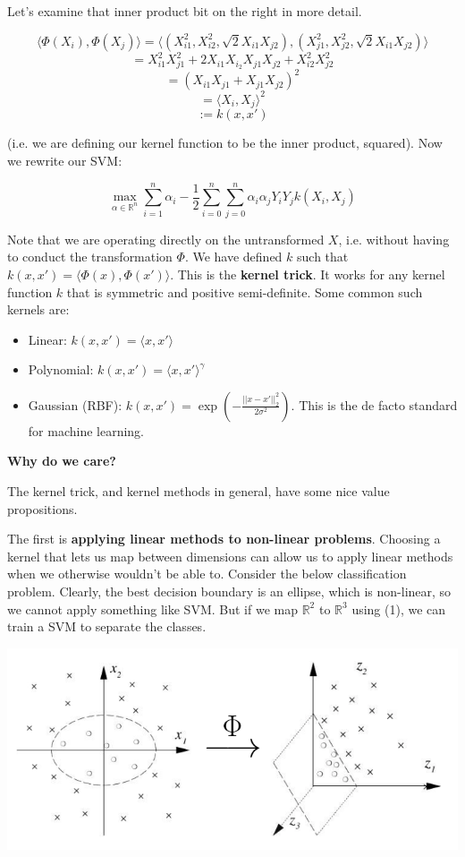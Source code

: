 \documentclass{article}
\begin{document}
Let's examine that inner product bit on the right in more detail.

$$
\langle \Phi(X_i), \Phi(X_j) \rangle = \langle (X_{i1}^2, X_{i2}^2,
\sqrt{2}X_{i1}X_{j2}),  (X_{j1}^2, X_{j2}^2,
\sqrt{2}X_{i1}X_{j2})\rangle
$$
$$
= X_{i1}^2X_{j1}^2 + 2X_{i1}X_{i_2}X_{j1}X_{j2} + X_{i2}^2X_{j2}^2
$$
$$
= (X_{i1}X_{j1} + X_{j1}X_{j2})^2
$$
$$
= \langle X_i, X_j \rangle^2
$$
$$
:= k(x, x')
$$

(i.e. we are defining our kernel function to be the inner product, squared). Now we rewrite our SVM:

$$
\max_{\alpha \in \mathbb{R}^n} 
\sum_{i=1}^n \alpha_i - \frac{1}{2} \sum_{i=0}^n \sum_{j=0}^n \alpha_i \alpha_j
Y_i Y_j k(X_i, X_j)
$$

Note that we are operating directly on the untransformed $X$, i.e. without
having to conduct the transformation $\Phi$. We have defined $k$ such that $k(x,
x') = \langle \Phi(x), \Phi(x') \rangle$. This is the \textbf{kernel trick}.
It works for any kernel function $k$ that is symmetric and positive
semi-definite. Some common such kernels are:
\begin{itemize}
\item Linear: $k(x, x') = \langle x, x' \rangle$
\item Polynomial: $k(x, x') = \langle x, x' \rangle^\gamma$
\item Gaussian (RBF): $k(x, x') = \exp(-\frac{||x - x'||^2_2}{2\sigma^2})$. This
is the de facto standard for machine learning.
\end{itemize}

\bigskip

\textbf{Why do we care?}

The kernel trick, and kernel methods in general, have some nice value
propositions.

The first is \textbf{applying linear methods to non-linear problems}. Choosing a
kernel that lets us map between dimensions can allow us to apply linear methods
when we otherwise wouldn't be able to. Consider the below classification
problem. Clearly, the best decision boundary is an ellipse, which is non-linear,
so we cannot apply something like SVM. But if we map $\mathbb{R}^2$ to
$\mathbb{R}^3$ using (1), we can train a SVM to separate the classes.

\includegraphics[scale=0.5]{kernel}
\end{document}
